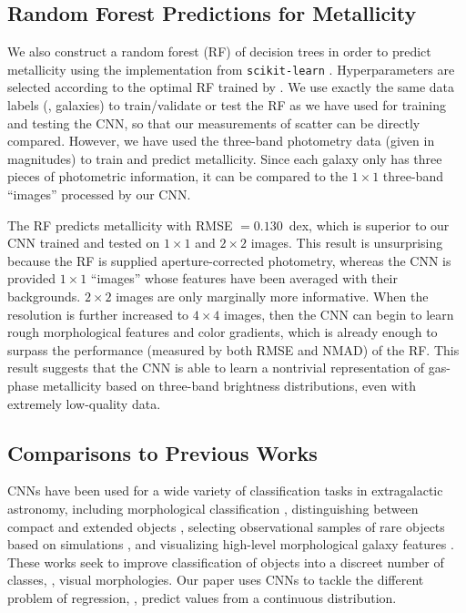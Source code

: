 \documentclass[fleqn,usenatbib]{mnras}
\begin{document}
\subsection{Random Forest Predictions for Metallicity}
We also construct a random forest (RF) of decision trees in order to predict metallicity using the implementation from \texttt{scikit-learn} \citep{Pedregosa2012}. Hyperparameters are selected according to the optimal RF trained by \cite{Acquaviva2016}. We use exactly the same data labels (\ie, galaxies) to train/validate or test the RF as we have used for training and testing the CNN, so that our measurements of scatter can be directly compared. However, we have used the \sdssi\sdssr\sdssg{} three-band photometry data (given in magnitudes) to train and predict metallicity. Since each galaxy only has three pieces of photometric information, it can be compared to the $1 \times 1$ three-band ``images'' processed by our CNN.

The RF predicts metallicity with RMSE $= 0.130$~dex, which is superior to our CNN trained and tested on $1\times 1$ and $2 \times 2$ images.
This result is unsurprising because the RF is supplied aperture-corrected photometry, whereas the CNN is provided $1 \times 1 $ \sdssi\sdssr\sdssg{} ``images'' whose features have been averaged with their backgrounds. $2 \times 2$ images are only marginally more informative. When the resolution is further increased to $4 \times 4$ images, then the CNN can begin to learn rough morphological features and color gradients, which is already enough to surpass the performance (measured by both RMSE and NMAD) of the RF.
This result suggests that the CNN is able to learn a nontrivial representation of gas-phase metallicity based on three-band brightness distributions, even with extremely low-quality data.

\subsection{Comparisons to Previous Works}\label{sec:previous work}
CNNs have been used for a wide variety of classification tasks in extragalactic astronomy, including morphological classification , distinguishing between compact and extended objects \citep{Kim2017}, selecting observational samples of rare objects based on simulations \citep{Huertas-Company2018, Lanusse2017}, and visualizing high-level morphological galaxy features \citep{Dai2018}. These works seek to improve classification of objects into a discreet number of classes, \ie, visual morphologies. Our paper uses CNNs to tackle the different problem of regression, \ie, predict values from a continuous distribution.
\end{document}
